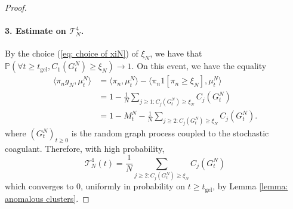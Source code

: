\begin{proof}
       \paragraph{3. Estimate on $\mathcal{T}^4_N$.} By the choice (\ref{eq: choice of xiN}) of $\xi_N$, we have that $\mathbb{P}(\forall  t\geq t_\text{gel}, C_1(G^N_t)\geq \xi_N)\rightarrow 1.$ On this event, we have the equality \begin{equation}
           \begin{split}
               \langle \pi_n g_N, \mu^N_t\rangle &=\langle \pi_n, \mu^N_t\rangle - \langle \pi_n 1[\pi_n\geq \xi_N], \mu^N_t\rangle \\[2ex] & = 1-\frac{1}{N}\sum_{j\geq 1: C_j(G^N_t)\ge \xi_N} C_j(G^N_t) \\[2ex] & = 1-M^N_t-\frac{1}{N}\sum_{j\ge 2:C_j(G^N_t)\ge \xi_N} C_j(G^N_t). 
           \end{split} 
       \end{equation} where $(G^N_t)_{t\geq 0}$ is the random graph process coupled to the stochastic coagulant. Therefore, with high probability, \begin{equation} \mathcal{T}^4_N(t) = \frac{1}{N}\sum_{j\ge 2:C_j(G^N_t)\ge \xi_N} C_j(G^N_t) \end{equation} which converges to $0$, uniformly in probability on $t\geq t_\text{gel}$, by Lemma \ref{lemma: anomalous clusters}.

\end{proof}
